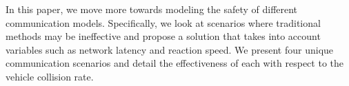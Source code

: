 In this paper, we move more towards modeling the safety of different communication models.
Specifically, we look at scenarios where traditional methods may be ineffective and propose
a solution that takes into account variables such as network latency and reaction speed.
We present four unique communication scenarios and detail the effectiveness of each
with respect to the vehicle collision rate.


\begin{comment}
(Will need to move this to the references section of final paper)

References:

[1] Herbert G. Tanner, Ali Jadbabaie and George J. Pappas. Coordination of Multiple Autonomous Vehicles.

[2] Theodore L. Willke, Patcharinee Tientrakool, and Nicholas F. Maxemchuk. A Survey of Inter-Vehicle Communication Protocols and Their Applications. In IEEE Communications Surveys  Tutorials, 2009.

[3] Richard M. Murray. Recent Research in Cooperative Control of Multi-Vehicle Systems.

[4] Keila Lima, Eduardo R. B. Marques, Jose Pinto, Joao B. Sousa. Dolphin: a task orchestration language for autonomous vehicle networks.

[5] Hui Oua, Tie-Qiao Tang. An extended two-lane car-following model accounting for inter-vehicle communication.
\end{comment}